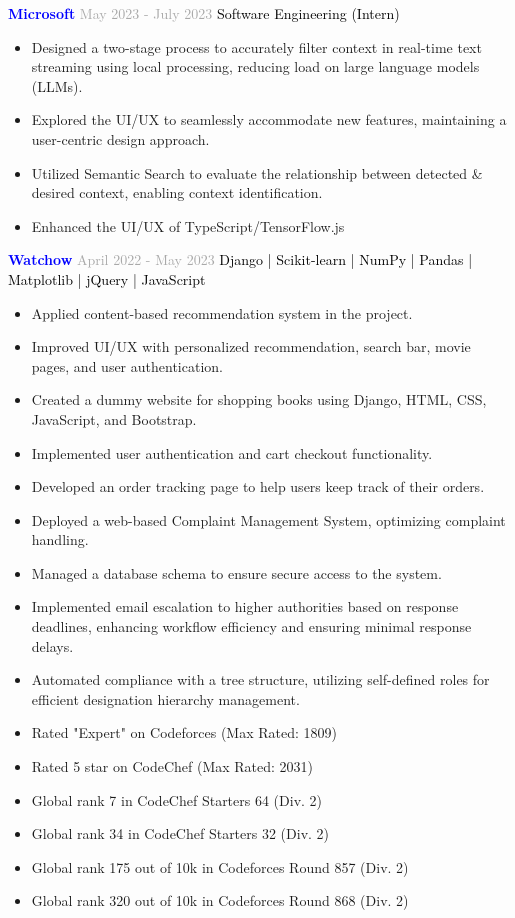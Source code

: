 \documentclass[letterpaper, 10pt, oneside]{article}
\begin{document}
\vspace{0.2cm}
\noindent
\textcolor{blue}{\textbf{Microsoft}} \hspace{9.3cm} \textcolor{darkgray}{May 2023 - July 2023}
\textcolor{black}{Software Engineering (Intern)}
\begin{itemize}
 \item Designed a two-stage process to accurately filter context in real-time text streaming using local processing, reducing load on large language models (LLMs).
 \item Explored the UI/UX to seamlessly accommodate new features, maintaining a user-centric design approach.
 \item Utilized Semantic Search to evaluate the relationship between detected \& desired context, enabling context identification.
 \item Enhanced the UI/UX of TypeScript/TensorFlow.js
\end{itemize}

\vspace{0.2cm}
\noindent
\textcolor{blue}{\textbf{Watchow}} \hspace{10.2cm} \textcolor{darkgray}{April 2022 - May 2023}
\textcolor{black}{Django | Scikit-learn | NumPy | Pandas | Matplotlib | jQuery | JavaScript}
\begin{itemize}
 \item Applied content-based recommendation system in the project.
 \item Improved UI/UX with personalized recommendation, search bar, movie pages, and user authentication.
 \item Created a dummy website for shopping books using Django, HTML, CSS, JavaScript, and Bootstrap.
 \item Implemented user authentication and cart checkout functionality.
 \item Developed an order tracking page to help users keep track of their orders.
 \item Deployed a web-based Complaint Management System, optimizing complaint handling.
 \item Managed a database schema to ensure secure access to the system.
 \item Implemented email escalation to higher authorities based on response deadlines, enhancing workflow efficiency and ensuring minimal response delays.
 \item Automated compliance with a tree structure, utilizing self-defined roles for efficient designation hierarchy management.
 \item Rated "Expert" on Codeforces (Max Rated: 1809)
 \item Rated 5 star on CodeChef (Max Rated: 2031)
 \item Global rank 7 in CodeChef Starters 64 (Div. 2)
 \item Global rank 34 in CodeChef Starters 32 (Div. 2)
 \item Global rank 175 out of 10k in Codeforces Round 857 (Div. 2)
 \item Global rank 320 out of 10k in Codeforces Round 868 (Div. 2)
\end{itemize}
\end{document}
